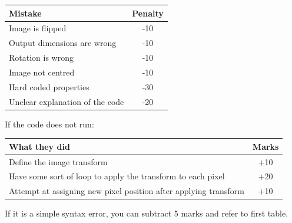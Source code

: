 \begin{table}[H]
    \begin{tabular}{l|c}
    \textbf{Mistake}                                                                        & \textbf{Penalty} \\ \hline
    Image is flipped                                                               & -10     \\ \hline
    Output dimensions are wrong                                                    & -10     \\ \hline
    Rotation is wrong                                                              & -10     \\ \hline
    Image not centred                                                              & -10     \\ \hline
    Hard coded properties                                                          & -30     \\ \hline
    Unclear explanation of the code                                                & -20     \\ \hline
  
    \end{tabular}
\end{table}

If the code does not run:
\begin{table}[H]
    \begin{tabular}{l|c}
    \textbf{What they did}                                                                        & \textbf{Marks} \\ \hline
    Define the image transform                                                              & +10     \\ \hline
    Have some sort of loop to apply the transform to each pixel                             & +20     \\ \hline
    Attempt at assigning new pixel position after applying transform                              & +10     \\ \hline
    \end{tabular}
\end{table}
If it is a simple syntax error, you can subtract 5 marks and refer to first table.

